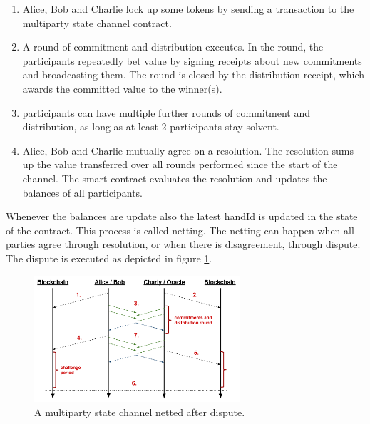 \begin{enumerate}
\item Alice, Bob and Charlie lock up some tokens by sending a transaction to the multiparty state channel contract.
\item A round of commitment and distribution executes. In the round, the participants repeatedly bet value by signing receipts about new commitments and broadcasting them. The round is  closed by the distribution receipt, which awards the committed value to the winner(s).
\item participants can have multiple further rounds of commitment and distribution, as long as at least 2 participants stay solvent.
\item Alice, Bob and Charlie mutually agree on a resolution. The resolution sums up the value transferred over all rounds performed since the start of the channel. The smart contract evaluates the resolution and updates the balances of all participants. 
\end{enumerate}

Whenever the balances are update also the latest handId is updated in the state of the contract. This process is called netting. The netting can happen when all parties agree through resolution, or when there is disagreement, through dispute. The dispute is executed as depicted in figure \ref{mpc_dispute}.

\begin{figure}[!ht]
\centering
\includegraphics[width=3.0in]{images/multiDispute.png}
\caption{A multiparty state channel netted after dispute.}
\label{mpc_dispute}
\end{figure}

